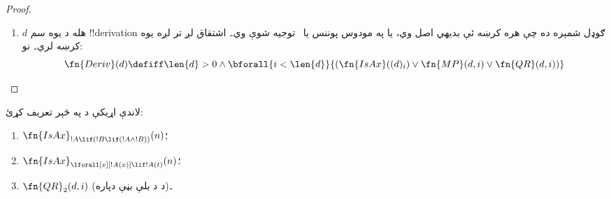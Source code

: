 \documentclass[../../../include/open-logic-section]{subfiles}
\begin{document}
\begin{proof}
\begin{enumerate}
\begin{enumerate}
  \item داسې !!a{formula}~$!A(x)$ وي چې يوازې يو ازاد متغير~$x$
    ولري؛ داسې چې
  \item کرښه~$i$، $!B\lif\lforall[x][!A(x)]$ ولري؛
  \item کومه کرښه $j<i$ د کوم ثابت~$c$ دپاره
    $!B\lif\Subst{!A}{c}{x}$ ولري؛ او
  \item $c$ په~$!B$ کښې نۀ راځي۔
  \end{enumerate}
  دا ټول په بنسټيز بازګشتي ډول ازمويلے شو، ځکه د~$!B$، $!A(x)$ او
  $x$ ګوډل شمېرې د~$i$ پر کرښه د فارمول له ګوډل شمېرې څخه وړې دي،
  او د~$c$ ګوډل شمېره د~$j$ پر کرښه د فارمول له ګوډل شمېرې څخه
  وړه ده:
  \begin{multline*}
    \fn{QR}_1(d, i) \defiff \bexists{j<i}{}\bexists{b < (d)_i}{\bexists{x <
        (d)_i}{\bexists{a < (d)_i}{\bexists{c < (d)_j}{(}}}}
    \\ \fn{Var}(x) \land \fn{Const}(c) \land {} \\
    (d)_i = \Gn{(} \concat
    b \concat \Gn{\lif} \concat \Gn{\lforall} \concat x \concat a
    \concat \Gn{)} \land {}\\
    (d)_j = \Gn{(} \concat b \concat
    \Gn{\lif} \concat \fn{Subst}(a,c,x) \concat \Gn{)} \land {}\\ \fn{Sent}(b)
    \land \fn{Sent}(\fn{Subst}(a,c,x)) \land {} \bforall{k <
      \len{b}}{(b)_k \neq (c)_0})
  \end{multline*}
  دلته فرض کوو چې $c$ او $x$ په ترتيب د ثابت او متغير ګوډل شمېرې
  دي چې د ترمونو په توګه ورته کتل شوي (يعنې د هغو سمبول-کوډونه نۀ
  دي)۔ دا چې $x$ د~$!A(x)$ يوازينے ازاد متغير دے، په دې ازميوو چې
  $\Subst{!A(x)}{c}{x}$ يوه !!a{sentence} ده؛ او دا چې $c$ په~$!B$
  کښې نۀ راځي، په دې شرط باوروو چې د~$!B$ هر سمبول له~$c$ څخه بېل
  وي۔

  د \QR{} بله بڼه د تمرین دپاره پرېږدو۔
\item $d$ هله د يوه سم !!{derivation} ګوډل شمېره ده چې هره کرښه ئې
  بديهي اصل وي، يا په مودوس پوننس يا~\QR{} توجيه شوې وي۔ اشتقاق لږ تر لږه يوه کرښه لري۔ نو:
  \[
  \fn{Deriv}(d) \defiff \len{d}>0 \land \bforall{i < \len{d}}{(\fn{IsAx}((d)_i) \lor
    \fn{MP}(d,i) \lor \fn{QR}(d, i))}
  \]
\end{enumerate}
\end{proof}

\begin{prob}
لاندې اړيکې د  په څېر تعريف
کړئ:
\begin{enumerate}
\item $\fn{IsAx}_{!A \lif (!B \lif (!A \land !B))}(n)$؛
\item $\fn{IsAx}_{\lforall[x][!A(x)] \lif !A(t)}(n)$؛
\item $\fn{QR}_{2}(d, i)$ (د \QR{} د بلې بڼې دپاره)۔
\end{enumerate}
\end{prob}
\end{document}
